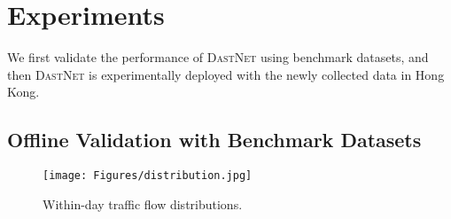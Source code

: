 \documentclass[sigconf]{acmart}
\theoremstyle{definition}
\begin{document}
\section{Experiments}\label{sec:exp}
We first validate the performance of \textsc{DastNet} using benchmark datasets, and then \textsc{DastNet} is experimentally deployed with the newly collected data in Hong Kong.
\subsection{Offline Validation with Benchmark Datasets}










\begin{figure}[h]
    \centering
    \texttt{[image: Figures/distribution.jpg]}
    \caption{Within-day traffic flow distributions.}
    \label{fig:distributions}
\end{figure}
\end{document}

